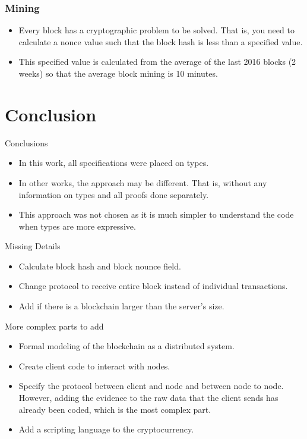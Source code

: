 \documentclass{beamer}
\begin{document}
\begin{frame}
   \frametitle{Mining}
   \begin{itemize}
     \item Every block has a cryptographic problem to be solved. That is,
       you need to calculate a nonce value such that the block hash is less than a specified value.
     \item This specified value is calculated from the average of the last 2016 blocks (2 weeks)
       so that the average block mining is 10 minutes.
   \end{itemize}
\end{frame}

\section{Conclusion}

\begin{frame}{Conclusions}
  \begin{itemize}
    \item In this work, all specifications were placed on types.
    \item In other works, the approach may be different.
      That is, without any information on types and all proofs done separately.
    \item This approach was not chosen as it is much simpler to understand the code when types are more expressive.
  \end{itemize}
\end{frame}

\begin{frame}{Missing Details}
  \begin{itemize}
    \item Calculate block hash and block nounce field.
    \item Change protocol to receive entire block instead of individual transactions.
    \item Add if there is a blockchain larger than the server's size.
  \end{itemize}
\end{frame}

\begin{frame}{More complex parts to add}
  \begin{itemize}
    \item Formal modeling of the blockchain as a distributed system.
    \item Create client code to interact with nodes.
    \item Specify the protocol between client and node and between node to node.
          However, adding the evidence to the raw data that the client sends has already been coded,
          which is the most complex part.
    \item Add a scripting language to the cryptocurrency.
  \end{itemize}
\end{frame}
\end{document}
